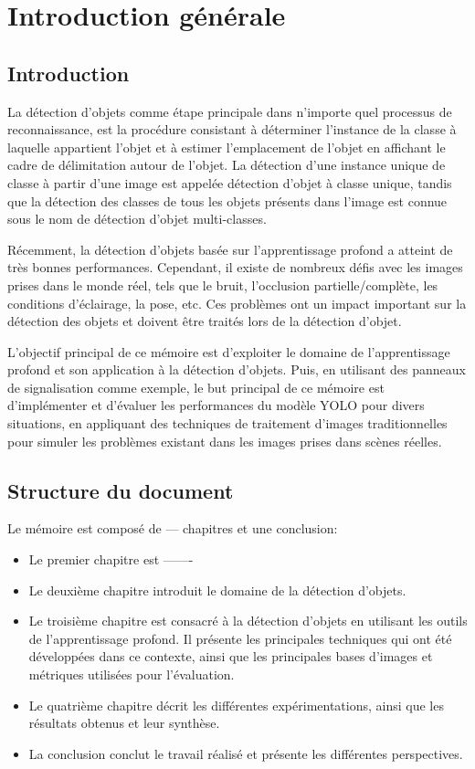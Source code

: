 \chapter*{Introduction générale}
\newpage
\pagestyle{fancy}
\fancyhead[L]{}
\renewcommand{\headrulewidth}{1pt}
\fancyfoot[C]{\thepage}


\section*{Introduction}
La détection d'objets comme étape principale dans n'importe quel processus  de reconnaissance, est la procédure consistant à déterminer l'instance de la classe à laquelle appartient l'objet et à estimer l'emplacement de l'objet en affichant le cadre de délimitation autour de l'objet. La détection d'une instance unique de classe à partir d'une image est appelée détection d'objet à classe unique, tandis que la détection des classes de tous les objets présents dans l'image est connue sous le nom de détection d'objet multi-classes. 

Récemment, la détection d'objets basée sur l'apprentissage profond a atteint de très bonnes performances. Cependant, il existe de nombreux défis avec les images prises dans le monde réel, tels que le bruit, l'occlusion partielle/complète, les conditions d'éclairage, la pose, etc. Ces problèmes ont un impact important sur la détection des objets et doivent être traités lors de la détection d'objet. 

L'objectif principal de ce mémoire est d'exploiter le domaine de l'apprentissage profond et son application à la détection d'objets. Puis, en utilisant des panneaux de signalisation comme exemple, le but principal de ce mémoire est d'implémenter et d'évaluer les performances du modèle YOLO pour divers situations, en appliquant des techniques de traitement d'images traditionnelles pour simuler les problèmes existant dans les images prises dans scènes réelles.

\section*{Structure du document}
Le mémoire est composé de --- chapitres et une conclusion:

\begin{itemize}
\item Le premier chapitre est -------
\item Le deuxième chapitre introduit le domaine de la détection d'objets.
\item Le troisième chapitre est consacré à la détection d'objets en utilisant les outils de l'apprentissage profond. Il présente les principales techniques qui ont été développées dans ce contexte, ainsi que les principales bases d'images et métriques utilisées pour l'évaluation.
\item Le quatrième chapitre décrit les différentes expérimentations, ainsi que les résultats obtenus et leur synthèse.
\item La conclusion conclut le travail réalisé et présente les différentes perspectives.
\end{itemize}